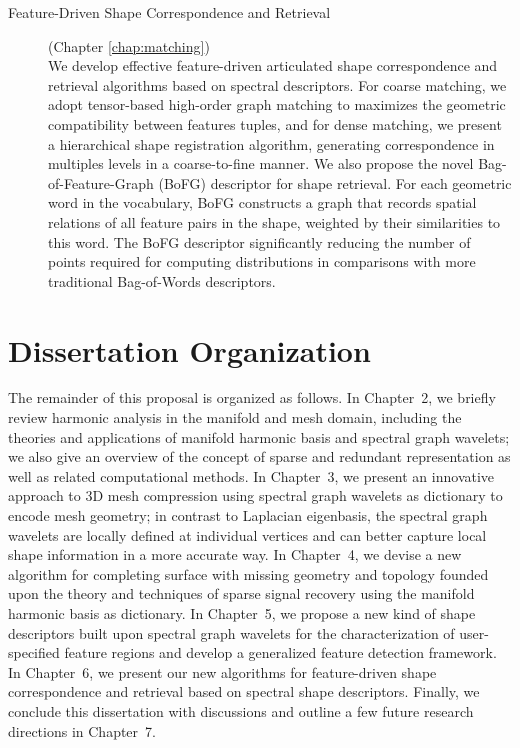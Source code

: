 \begin{description}
  \item[Feature-Driven Shape Correspondence and Retrieval] (Chapter \ref{chap:matching})\hfill \\
  We develop effective feature-driven articulated shape
  correspondence and retrieval algorithms based on spectral
  descriptors. For coarse matching, we adopt tensor-based high-order
  graph matching to maximizes the geometric compatibility between
  features tuples, and for dense matching, we present a hierarchical
  shape registration algorithm, generating correspondence in multiples
  levels in a coarse-to-fine manner. We also propose the novel
  Bag-of-Feature-Graph (BoFG) descriptor for shape retrieval.
  For each geometric word in the vocabulary, BoFG constructs a graph that records
  spatial relations of all feature pairs in the shape, weighted by their
  similarities to this word. The BoFG descriptor significantly reducing the
  number of points required for computing distributions in comparisons
  with more traditional Bag-of-Words descriptors.
\end{description}

\section{Dissertation Organization}
The remainder of this proposal is organized as follows.
In Chapter~2, we briefly review harmonic analysis in the manifold and mesh
domain, including the theories and applications of manifold harmonic basis
and spectral graph wavelets; we also give an overview of the concept of
sparse and redundant representation as well as related computational methods.
In Chapter~3, we present an innovative approach to 3D mesh compression
using spectral graph wavelets as dictionary to encode mesh geometry; in
contrast to Laplacian eigenbasis, the spectral graph wavelets are locally
defined at individual vertices and can better capture local shape
information in a more accurate way.
In Chapter~4, we devise a new algorithm for completing surface with missing geometry
and topology founded upon the theory and techniques of sparse signal recovery
using the manifold harmonic basis as dictionary.
In Chapter~5, we propose a new kind of shape descriptors built upon
spectral graph wavelets for the characterization of user-specified feature regions
and develop a generalized feature detection framework.
In Chapter~6, we present our new algorithms for feature-driven shape correspondence 
and retrieval based on spectral shape descriptors. 
Finally, we conclude this dissertation 
with discussions and outline a few future research directions in Chapter~7.   